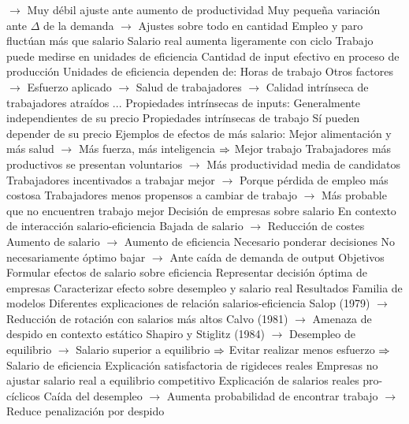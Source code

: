 \documentclass{nuevotema}
\begin{document}
\begin{esquemal}
				\4[] $\to$ Muy débil ajuste ante aumento de productividad
				\4[]  Muy pequeña variación ante $\Delta$ de la demanda
				\4[] $\to$ Ajustes sobre todo en cantidad
				\4[$\then$] Empleo y paro fluctúan más que salario
				\4[$\then$] Salario real aumenta ligeramente con ciclo
				\4 Trabajo puede medirse en unidades de eficiencia
				\4[] Cantidad de input efectivo en proceso de producción
				\4 Unidades de eficiencia dependen de:
				\4[] Horas de trabajo
				\4[] Otros factores
				\4[] $\to$ Esfuerzo aplicado
				\4[] $\to$ Salud de trabajadores
				\4[] $\to$ Calidad intrínseca de trabajadores atraídos
				\4[] ...
				\4 Propiedades intrínsecas de inputs:
				\4[] Generalmente independientes de su precio
				\4 Propiedades intrínsecas de trabajo
				\4[] Sí pueden depender de su precio
				\4 Ejemplos de efectos de más salario:
				\4[] Mejor alimentación y más salud
				\4[] $\to$ Más fuerza, más inteligencia
				\4[] $\then$ Mejor trabajo
				\4[] Trabajadores más productivos se presentan voluntarios
				\4[] $\to$ Más productividad media de candidatos
				\4[] Trabajadores incentivados a trabajar mejor
				\4[] $\to$ Porque pérdida de empleo más costosa
				\4[] Trabajadores menos propensos a cambiar de trabajo
				\4[] $\to$ Más probable que no encuentren trabajo mejor
				\4 Decisión de empresas sobre salario
				\4[] En contexto de interacción salario-eficiencia
				\4[] Bajada de salario
				\4[] $\to$ Reducción de costes
				\4[] Aumento de salario
				\4[] $\to$ Aumento de eficiencia
				\4[] Necesario ponderar decisiones
				\4[] No necesariamente óptimo bajar
				\4[] $\to$ Ante caída de demanda de output
			\3 Objetivos
				\4 Formular efectos de salario sobre eficiencia
				\4 Representar decisión óptima de empresas
				\4 Caracterizar efecto sobre desempleo y salario real
			\3 Resultados
				\4 Familia de modelos
				\4 Diferentes explicaciones de relación salarios-eficiencia
				\4[] Salop (1979)
				\4[] $\to$ Reducción de rotación con salarios más altos
				\4[] Calvo (1981)
				\4[] $\to$ Amenaza de despido en contexto estático
				\4[] Shapiro y Stiglitz (1984)
				\4[] $\to$ Desempleo de equilibrio
				\4[] $\to$ Salario superior a equilibrio
				\4[] $\then$ Evitar realizar menos esfuerzo
				\4[] $\then$ Salario de eficiencia
				\4 Explicación satisfactoria de rigideces reales
				\4[] Empresas no ajustar salario real a equilibrio competitivo
				\4 Explicación de salarios reales pro-cíclicos
				\4[] Caída del desempleo
				\4[] $\to$ Aumenta probabilidad de encontrar trabajo
				\4[] $\to$ Reduce penalización por despido

\end{esquemal}
\end{document}
